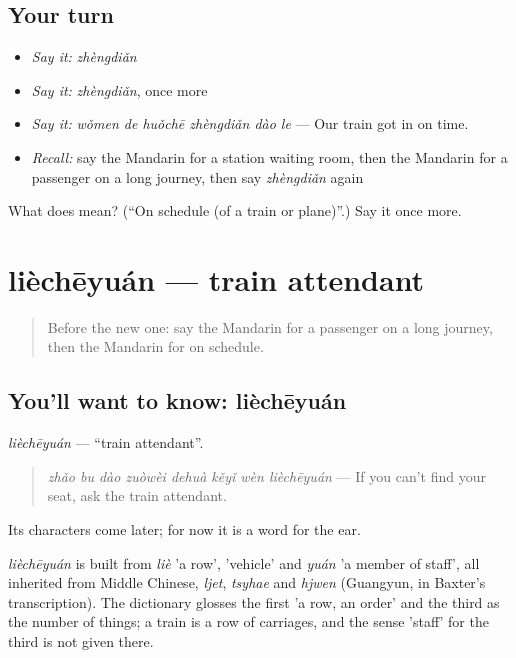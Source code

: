 \subsection*{Your turn}
\begin{itemize}
\raggedright
  \item \emph{Say it:} \emph{zhèngdiǎn}
  \item \emph{Say it:} \emph{zhèngdiǎn}, once more
  \item \emph{Say it:} \emph{wǒmen de huǒchē zhèngdiǎn dào le} — Our train got in on time.
  \item \emph{Recall:} say the Mandarin for a station waiting room, then the Mandarin for a passenger on a long journey, then say \emph{zhèngdiǎn} again
\end{itemize}

\begin{tcolorbox}[breakable,colback=teal!4,colframe=teal!35!black,title={Before you move on}]
What does  mean? (\textquotedblleft{}On schedule (of a train or plane)\textquotedblright{}.) Say it once more.
\end{tcolorbox}
\section[lièchēyuán]{lièchēyuán — train attendant}

\label{lesson:ZH-C403-liecheyuan}



\begin{quote}
Before the new one: say the Mandarin for a passenger on a long journey, then the Mandarin for on schedule.
\end{quote}

\subsection*{You'll want to know: lièchēyuán}
\emph{lièchēyuán} — \textquotedblleft{}train attendant\textquotedblright{}.

\begin{quote}
\emph{zhǎo bu dào zuòwèi dehuà kěyǐ wèn lièchēyuán} — If you can't find your seat, ask the train attendant.
\end{quote}

Its characters come later; for now it is a word for the ear.

\begin{cousinweb}
\emph{lièchēyuán} is built from \emph{liè} 'a row',  'vehicle' and \emph{yuán} 'a member of staff', all inherited from Middle Chinese, \emph{ljet}, \emph{tsyhae} and \emph{hjwen} (Guangyun, in Baxter's transcription). The dictionary glosses the first 'a row, an order' and the third as the number of things; a train is a row of carriages, and the sense 'staff' for the third is not given there.
\end{cousinweb}

